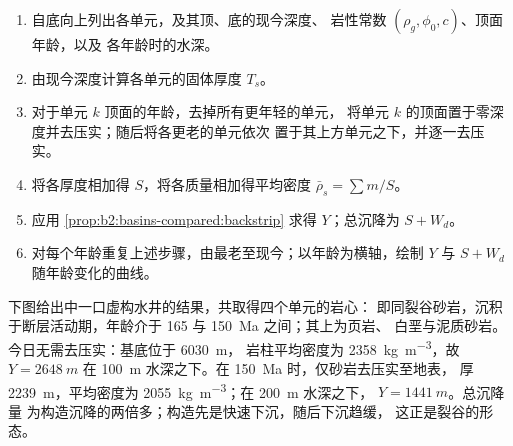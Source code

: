 \begin{method}[水井的回剥法]\label{met:b2:basins-compared:backstrip}
\begin{enumerate}
  \item 自底向上列出各单元，及其顶、底的现今深度、
        岩性常数 $(\rho_g, \phi_0, c)$、顶面年龄，以及
        各年龄时的水深。
  \item 由现今深度计算各单元的固体厚度 $T_s$。
  \item 对于单元 $k$ 顶面的年龄，去掉所有更年轻的单元，
        将单元 $k$ 的顶面置于零深度并去压实；随后将各更老的单元依次
        置于其上方单元之下，并逐一去压实。
  \item 将各厚度相加得 $S$，将各质量相加得平均密度
        $\bar\rho_s = \sum m / S$。
  \item 应用 \cref{prop:b2:basins-compared:backstrip} 求得 $Y$；总沉降为
        $S + W_d$。
  \item 对每个年龄重复上述步骤，由最老至现今；以年龄为横轴，绘制 $Y$ 与 $S + W_d$ 随年龄变化的曲线。
\end{enumerate}
\end{method}

下图给出中一口虚构水井的结果，共取得四个单元的岩心：
即同裂谷砂岩，沉积于断层活动期，年龄介于 165 与 \qty{150}{Ma} 之间；其上为页岩、
白垩与泥质砂岩。今日无需去压实：基底位于 \qty{6030}{m}，
岩柱平均密度为 \qty{2358}{kg.m^{-3}}，故 $Y = \qty{2648}{m}$
在 \qty{100}{m} 水深之下。在 \qty{150}{Ma} 时，仅砂岩去压实至地表，
厚 \qty{2239}{m}，平均密度为 \qty{2055}{kg.m^{-3}}；在 \qty{200}{m} 水深之下，
$Y = \qty{1441}{m}$。总沉降量
为构造沉降的两倍多；构造先是快速下沉，随后下沉趋缓，
这正是裂谷的形态。

